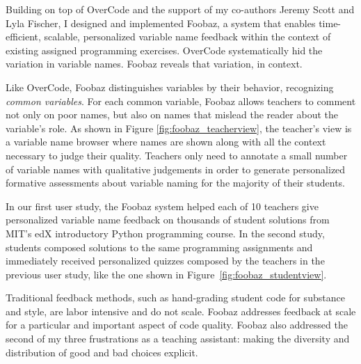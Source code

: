 Building on top of OverCode and the support of my co-authors Jeremy Scott and Lyla Fischer, I designed and implemented Foobaz, a system that enables time-efficient, scalable, personalized variable name feedback within the context of existing assigned programming exercises. OverCode systematically hid the variation in variable names. Foobaz reveals that variation, in context. %

Like OverCode, Foobaz distinguishes variables by their behavior, recognizing {\it common variables}. For each common variable, Foobaz allows teachers to comment not only on poor names, but also on names that mislead the reader about the variable's role. As shown in Figure \ref{fig:foobaz_teacherview}, the teacher's view is a variable name browser where names are shown along with all the context necessary to judge their quality. Teachers only need to annotate a small number of variable names with qualitative judgements in order to generate personalized formative assessments about variable naming for the majority of their students.

In our first user study, the Foobaz system helped each of 10 teachers give personalized variable name feedback on thousands of student solutions from MIT's edX introductory Python programming course. In the second study, students composed solutions to the same programming assignments and immediately received personalized quizzes composed by the teachers in the previous user study, like the one shown in Figure~\ref{fig:foobaz_studentview}.

Traditional feedback methods, such as hand-grading student code for substance and style, are labor intensive and do not scale. Foobaz addresses feedback at scale for a particular and important aspect of code quality. Foobaz also addressed the second of my three frustrations as a teaching assistant: making the diversity and distribution of good and bad choices explicit. %

